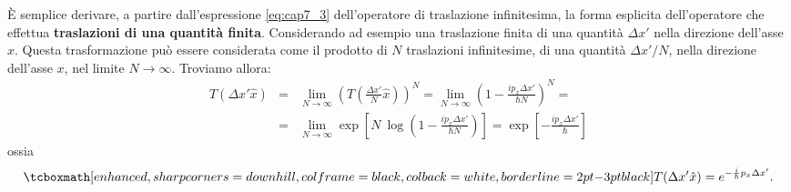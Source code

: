 \documentclass[a4paper,12pt,oneside]{book}
\begin{document}
È semplice derivare, a partire dall'espressione \eqref{eq:cap7_3} dell'operatore di traslazione infinitesima, la forma esplicita dell'operatore che effettua \textbf{traslazioni di una quantità finita}. Considerando ad esempio una traslazione finita di una quantità $\Delta x '$ nella direzione dell'asse $x$. Questa trasformazione può essere considerata come il prodotto di $N$ traslazioni infinitesime, di una quantità $\Delta x ' / N$, nella direzione dell'asse $x$, nel limite $N\rightarrow \infty $. Troviamo allora:
	\begin{eqnarray}
	T(\Delta x'\hat{x}) & = & \lim _{N\rightarrow \infty} \left(T \left( \frac{\Delta x'}{N}\hat{x} \right) \right) ^N = \lim _{N\rightarrow \infty} \left( 1- \frac{i p_x \Delta x'}{\hbar N} \right) ^N =\nonumber \\
	&=& \lim _{N\rightarrow \infty} \exp \left[N\ \log \left(1- \frac{i p_x \Delta x'}{\hbar N}  \right) \right] =   \exp \left[  -\frac{i p_x \Delta x'}{\hbar}  \right] 
	\end{eqnarray}
ossia
	\begin{equation}
		\tcboxmath[enhanced, sharp corners=downhill, colframe=black, colback=white, borderline={2pt}{-3pt}{black}]{	
			T(\Delta x'\hat{x}) = e^{-\frac{i}{\hbar} p_x \Delta x' }.
			}
	\end{equation}
\end{document}
